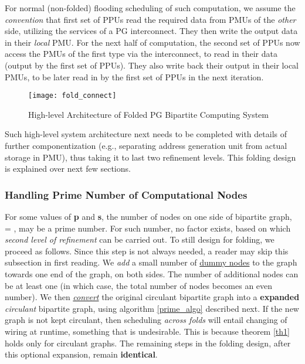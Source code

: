 \documentclass[12pt]{article}
\begin{document}
For normal (non-folded) flooding scheduling of such computation, we assume
the \textit{convention} that
first set of PPUs read the required data from PMUs of
the \textit{other} side, utilizing the services of a PG interconnect. They
then write the output data in their \textit{local} PMU. For the
next half of computation, the second set of PPUs now
access the PMUs of the first type via the interconnect, to read in
their data (output by the first set of PPUs). They also write
back their output in their local PMUs, to be later read in by the
first set of PPUs in the next iteration.

\begin{figure}[h]
\begin{center}
\texttt{[image: fold\_connect]}
\end{center}
\caption{High-level Architecture of Folded PG Bipartite Computing System}
\label{fold_arch}
\end{figure}

Such high-level system architecture next needs to be completed with details
of further componentization (e.g., separating address generation unit from
actual storage in PMU), thus taking it to last two refinement levels.
This folding design is explained over next few sections.

\subsubsection{Handling Prime Number of Computational Nodes}
\label{prime_sec}
For some values of \textbf{p} and \textbf{s}, the number of nodes on one
side of bipartite graph,  = {\large },
may be a prime number. For such number, no factor exists, based on which
\textit{second level of refinement} can be carried out. To still design for
folding, we proceed as follows. Since this step is not always
needed, a reader may skip this subsection in first reading. We \textit{add} a small
number of \uline{dummy nodes} to the graph towards one end of the graph,
on both sides. The number of additional nodes can be at least
one (in which case, the total number of nodes becomes an even
number). We then \uline{\textit{convert}} the
original circulant bipartite graph into a
\textbf{expanded} \textit{circulant} bipartite
graph, using algorithm \ref{prime_algo} described next. If the
new graph is not kept circulant, then scheduling \textit{across
folds} will entail changing of wiring at runtime, something that is
undesirable. This is because theorem \ref{th1} holds only for circulant
graphs. The remaining steps in the folding design, after this
optional expansion, remain \textbf{identical}.
\end{document}
